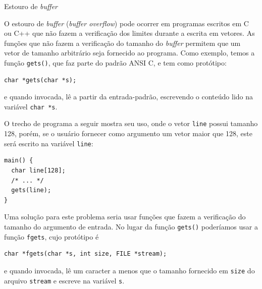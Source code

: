 \lecturetitle{\insertlecture}{\course}
\frame{\maketitle}




\begin{frame}[fragile]{Estouro de {\it buffer\/}}

O estouro de {\it buffer\/} ({\it buffer overflow}) pode ocorrer em programas
escritos em C ou C++ que não fazem a verificação dos limites durante a
escrita em vetores. As funções que não fazem a verificação do tamanho
do {\it buffer\/} permitem que um vetor de tamanho arbitrário seja fornecido
ao programa. Como exemplo, temos a função {\tt gets()}, que faz parte do
padrão ANSI C, e tem como protótipo:

\begin{lstlisting}
char *gets(char *s);
\end{lstlisting}

e quando invocada, lê a partir da entrada-padrão, 
escrevendo o conteúdo lido na variável {\tt char *s}.

\end{frame}

\begin{frame}[fragile]{}

O trecho de programa a seguir mostra seu uso, onde o vetor {\tt line\/}
possui tamanho 128, porém, se o usuário fornecer como argumento um
vetor maior que 128, este será escrito na variável {\tt line}:

\begin{lstlisting}
main() {
  char line[128];
  /* ... */
  gets(line);
}
\end{lstlisting}

\end{frame}

\begin{frame}[fragile]{}

Uma solução para este problema seria usar funções que fazem a
verificação do tamanho do argumento de entrada. No lugar da função 
{\tt gets()} poderíamos usar a função {\tt fgets}, cujo protótipo é

\begin{lstlisting}
char *fgets(char *s, int size, FILE *stream);
\end{lstlisting}

e quando invocada, lê um caracter a menos que o tamanho
fornecido em {\tt size} do arquivo {\tt stream} e escreve na variável
{\tt s}.
\end{frame}


